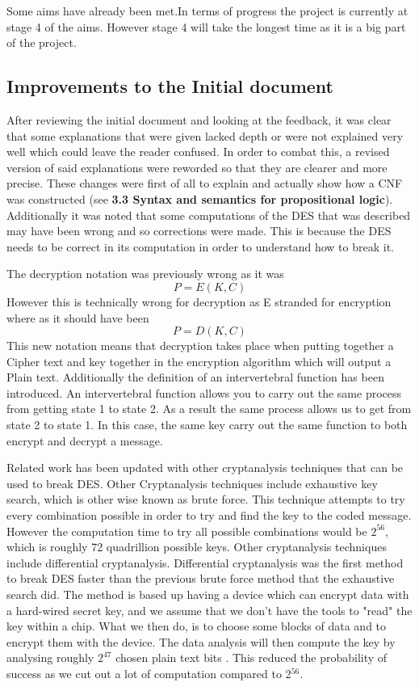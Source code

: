 \documentclass[11pt,a4paper]{article}
\begin{document}
Some aims have already been met.In terms of progress the project is currently at stage 4 of the aims. However stage 4 will take the longest time as it is a big part of the project. 
\subsection{Improvements to the Initial document}
After reviewing the initial document and looking at the feedback, it was clear that some explanations that were given lacked depth or were not explained very well which could leave the reader confused. In order to combat this, a revised version of said explanations were reworded so that they are clearer and more precise. These changes were first of all to explain and actually show how a CNF was constructed (see \textbf{3.3 Syntax and semantics for propositional logic}). Additionally it was noted that some computations of the DES that was described may have been wrong and so corrections were made. This is because the DES needs to be correct in its computation in order to understand how to break it.

The decryption notation was previously wrong as it was 
\begin{displaymath}
P = E(K,C)
\end{displaymath}
However this is technically wrong for decryption as E stranded for encryption where as it should have been
\begin{displaymath}
P = D(K,C)
\end{displaymath}
This new notation means that decryption takes place when putting together a Cipher text and key together in the encryption algorithm which will output a Plain text. Additionally the definition of an intervertebral function has been introduced. An intervertebral function allows you to carry out the same process from getting state 1 to state 2. As a result the same process allows us to get from state 2 to state 1. In this case, the same key carry out the same function to both encrypt and decrypt a message.        

Related work has been updated with other cryptanalysis techniques that can be used to break DES. Other Cryptanalysis techniques include exhaustive key search, which is other wise known as brute force. This technique attempts to try every combination possible in order to try and find the key to the coded message. However the computation time to try all possible combinations would be $2^{56}$, which is roughly 72 quadrillion possible keys. 
Other cryptanalysis techniques include differential cryptanalysis. Differential cryptanalysis was the first method to break DES faster than the previous brute force method that the exhaustive search did. The method is based up having a device which can encrypt data with a hard-wired secret key, and we assume that we don't have the tools to "read" the key within a chip. What we then do, is to choose some blocks of data and to encrypt them with the device. The data analysis will then compute the key by analysing roughly $2^47$ chosen plain text bits \cite{Junod2013LASEC}. This reduced  the probability of success as we cut out a lot of computation compared to 2$^{56}$. 
\end{document}
